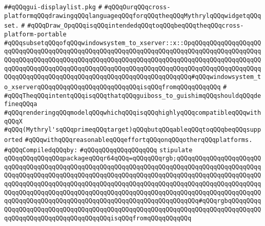 \label{src/lib/x-kit/widget/theme/gui-displaylist.pkg}
\verb|##qQQqgui-displaylist.pkg|\newline
\verb|#|\newline
\verb|#qQQqOurqQQqcross-platformqQQqdrawingqQQqlanguageqQQqforqQQqtheqQQqMythrylqQQqwidgetqQQqset.|\newline
\verb|#|\newline
\verb|#qQQqDraw_OpqQQqisqQQqintendedqQQqtoqQQqbeqQQqtheqQQqcross-platform-portable|\newline
\verb|#qQQqsubsetqQQqofqQQqwindowsystem_to_xserver::x::OpqQQqqQQqqQQqqQQqqQQqqQQqqQQqqQQqqQQqqQQqqQQqqQQqqQQqqQQqqQQqqQQqqQQqqQQqqQQqqQQqqQQqqQQqqQQqqQQqqQQqqQQqqQQqqQQqqQQqqQQqqQQqqQQqqQQqqQQqqQQqqQQqqQQqqQQqqQQqqQQqqQQqqQQqqQQqqQQqqQQqqQQqqQQqqQQqqQQqqQQqqQQqqQQqqQQqqQQqqQQqqQQqqQQqqQQqqQQqqQQqqQQqqQQqqQQqqQQqqQQqqQQqqQQqqQQqqQQqqQQq#qQQqwindowsystem_to_xserverqQQqqQQqqQQqqQQqqQQqqQQqqQQqisqQQqfromqQQqqQQqqQQq|\newline
\verb|#|\newline
\verb|#qQQqTheqQQqintentqQQqisqQQqthatqQQqguiboss_to_guishimqQQqshouldqQQqdefineqQQqa|\newline
\verb|#qQQqrenderingqQQqmodelqQQqwhichqQQqisqQQqhighlyqQQqcompatibleqQQqwithqQQqX|\newline
\verb|#qQQq(Mythryl'sqQQqprimeqQQqtarget)qQQqbutqQQqableqQQqtoqQQqbeqQQqsupported|\newline
\verb|#qQQqwithqQQqreasonableqQQqeffortqQQqonqQQqotherqQQqplatforms.|\newline
\newline
\verb|#qQQqCompiledqQQqby:|\newline
\verb|#qQQqqQQqqQQqqQQqqQQq|\newline
\newline
\verb|stipulate|\newline
\verb|qQQqqQQqqQQqqQQqpackageqQQqr64qQQq=qQQqqQQqrgb;qQQqqQQqqQQqqQQqqQQqqQQqqQQqqQQqqQQqqQQqqQQqqQQqqQQqqQQqqQQqqQQqqQQqqQQqqQQqqQQqqQQqqQQqqQQqqQQqqQQqqQQqqQQqqQQqqQQqqQQqqQQqqQQqqQQqqQQqqQQqqQQqqQQqqQQqqQQqqQQqqQQqqQQqqQQqqQQqqQQqqQQqqQQqqQQqqQQqqQQqqQQqqQQqqQQqqQQqqQQqqQQqqQQqqQQqqQQqqQQqqQQqqQQqqQQqqQQqqQQqqQQqqQQqqQQqqQQqqQQqqQQqqQQqqQQqqQQqqQQqqQQqqQQqqQQqqQQqqQQqqQQqqQQqqQQqqQQqqQQqqQQqqQQqqQQqqQQq#qQQqrgbqQQqqQQqqQQqqQQqqQQqqQQqqQQqqQQqqQQqqQQqqQQqqQQqqQQqqQQqqQQqqQQqqQQqqQQqqQQqqQQqqQQqqQQqqQQqqQQqqQQqqQQqqQQqisqQQqfromqQQqqQQqqQQq|\newline
